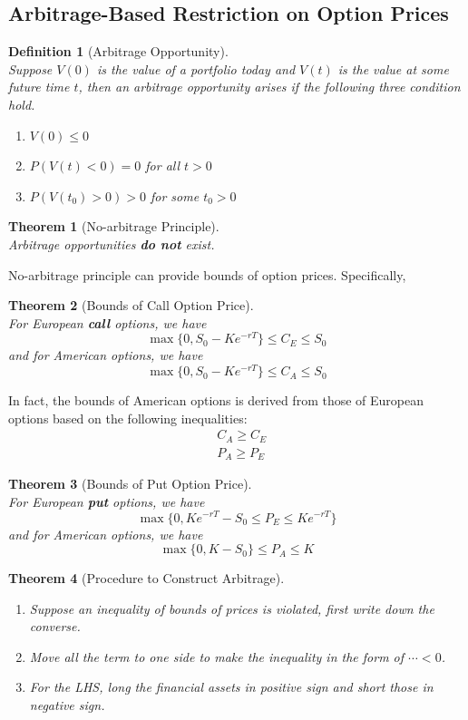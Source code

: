 \documentclass[12pt]{article}
\newtheorem{definition}{Definition}[section]
\newtheorem{theorem}{Theorem}[section]
\theoremstyle{definition}
\begin{document}
\subsection{Arbitrage-Based Restriction on Option Prices}
\begin{definition}[Arbitrage Opportunity]\hfill\\\normalfont
Suppose $V(0)$ is the value of a portfolio today and $V(t)$ is the value at some future time $t$, then an arbitrage opportunity arises if the following three condition hold.
\begin{enumerate}
  \item $V(0)\leq 0$
  \item $P(V(t)<0)=0$ for all $t>0$
  \item $P(V(t_0)>0)>0$ for some $t_0>0$
\end{enumerate}
\end{definition}
\begin{theorem}[No-arbitrage Principle]
\hfill\\\normalfont Arbitrage opportunities \textbf{do not} exist.
\end{theorem}
No-arbitrage principle can provide bounds of option prices. Specifically,
\begin{theorem}[Bounds of Call Option Price]
\hfill\\\normalfont For European \textbf{call} options, we have
\[
\max\{0,S_0-Ke^{-rT}\}\leq C_E\leq S_0
\]
and for American options, we have
\[
\max\{0, S_0-Ke^{-rT}\}\leq C_A\leq S_0
\]
\end{theorem}
In fact, the bounds of American options is derived from those of European options based on the following inequalities:
\begin{align*}
&C_A\geq C_E\\
&P_A\geq P_E
\end{align*}
\begin{theorem}[Bounds of Put Option Price]
\hfill\\\normalfont For European \textbf{put} options, we have
\[
\max\{0, Ke^{-rT}-S_0\leq P_E\leq Ke^{-rT}\}
\]
and for American options, we have
\[
\max\{0, K-S_0\}\leq P_A\leq K
\]
\end{theorem}
\begin{theorem}[Procedure to Construct Arbitrage]
\hfill\\\normalfont
\begin{enumerate}
\item Suppose an inequality of bounds of prices is violated, first write down the converse.
\item Move all the term to one side to make the inequality in the form of $\cdots<0$.
\item For the LHS, long the financial assets in positive sign and short those in negative sign.
\end{enumerate}
\end{theorem}
\end{document}
